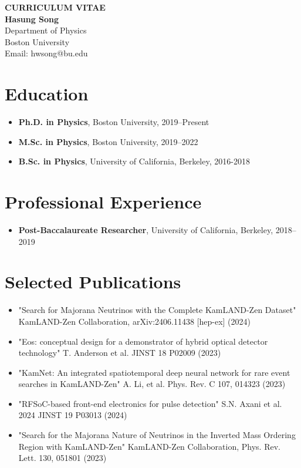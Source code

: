 
\begin{center}
    {\LARGE \bf CURRICULUM VITAE}\\[0.5in]
    {\large \bf Hasung Song}\\[0.1in]
    Department of Physics\\
    Boston University\\
    Email: hwsong@bu.edu\\
\end{center}

\vspace{0.3in}

\section*{Education}
\begin{itemize}[leftmargin=*]
    \item \textbf{Ph.D. in Physics}, Boston University, 2019--Present
    \item \textbf{M.Sc. in Physics}, Boston University, 2019--2022
    \item \textbf{B.Sc. in Physics}, University of California, Berkeley, 2016-2018
\end{itemize}

\section*{Professional Experience}
\begin{itemize}[leftmargin=*]
    \item \textbf{Post-Baccalaureate Researcher}, University of California, Berkeley, 2018--2019
\end{itemize}

\section*{Selected Publications}
\begin{itemize}[leftmargin=*]
	\item "Search for Majorana Neutrinos with the Complete KamLAND-Zen Dataset" KamLAND-Zen Collaboration,	arXiv:2406.11438 [hep-ex] (2024)
	\item "Eos: conceptual design for a demonstrator of hybrid optical detector technology" T. Anderson et al. JINST 18 P02009 (2023)
	\item "KamNet: An integrated spatiotemporal deep neural network for rare event searches in KamLAND-Zen" A. Li, et al. Phys. Rev. C 107, 014323 (2023)
	\item "RFSoC-based front-end electronics for pulse detection" S.N. Axani et al. 2024 JINST 19 P03013 (2024)
	\item "Search for the Majorana Nature of Neutrinos in the Inverted Mass Ordering Region with KamLAND-Zen" KamLAND-Zen Collaboration, Phys. Rev. Lett. 130, 051801 (2023)
\end{itemize}

